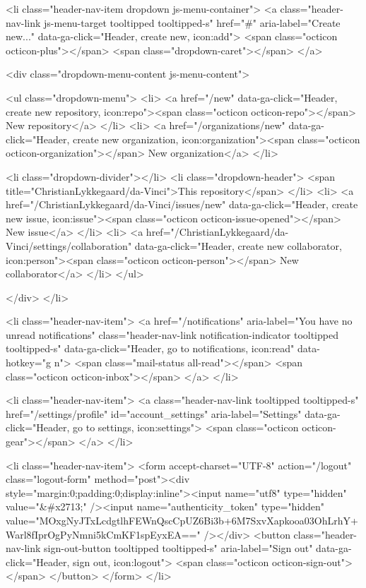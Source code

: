   <li class="header-nav-item dropdown js-menu-container">
    <a class="header-nav-link js-menu-target tooltipped tooltipped-s" href="#" aria-label="Create new..." data-ga-click="Header, create new, icon:add">
      <span class="octicon octicon-plus"></span>
      <span class="dropdown-caret"></span>
    </a>

    <div class="dropdown-menu-content js-menu-content">
      
<ul class="dropdown-menu">
  <li>
    <a href="/new" data-ga-click="Header, create new repository, icon:repo"><span class="octicon octicon-repo"></span> New repository</a>
  </li>
  <li>
    <a href="/organizations/new" data-ga-click="Header, create new organization, icon:organization"><span class="octicon octicon-organization"></span> New organization</a>
  </li>


    <li class="dropdown-divider"></li>
    <li class="dropdown-header">
      <span title="ChristianLykkegaard/da-Vinci">This repository</span>
    </li>
      <li>
        <a href="/ChristianLykkegaard/da-Vinci/issues/new" data-ga-click="Header, create new issue, icon:issue"><span class="octicon octicon-issue-opened"></span> New issue</a>
      </li>
      <li>
        <a href="/ChristianLykkegaard/da-Vinci/settings/collaboration" data-ga-click="Header, create new collaborator, icon:person"><span class="octicon octicon-person"></span> New collaborator</a>
      </li>
</ul>

    </div>
  </li>

  <li class="header-nav-item">
        <a href="/notifications" aria-label="You have no unread notifications" class="header-nav-link notification-indicator tooltipped tooltipped-s" data-ga-click="Header, go to notifications, icon:read" data-hotkey="g n">
        <span class="mail-status all-read"></span>
        <span class="octicon octicon-inbox"></span>
</a>
  </li>

  <li class="header-nav-item">
    <a class="header-nav-link tooltipped tooltipped-s" href="/settings/profile" id="account_settings" aria-label="Settings" data-ga-click="Header, go to settings, icon:settings">
      <span class="octicon octicon-gear"></span>
    </a>
  </li>

  <li class="header-nav-item">
    <form accept-charset="UTF-8" action="/logout" class="logout-form" method="post"><div style="margin:0;padding:0;display:inline"><input name="utf8" type="hidden" value="&#x2713;" /><input name="authenticity_token" type="hidden" value="MOxgNyJTxLcdgtlhFEWnQscCpUZ6Bi3b+6M7SxvXapkooa03OhLrhY+Warl8fIprOgPyNmni5kCmKF1spEyxEA==" /></div>
      <button class="header-nav-link sign-out-button tooltipped tooltipped-s" aria-label="Sign out" data-ga-click="Header, sign out, icon:logout">
        <span class="octicon octicon-sign-out"></span>
      </button>
</form>  </li>

